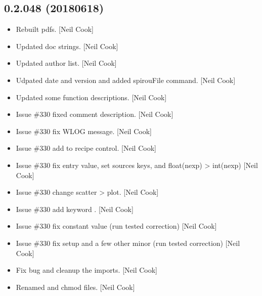 \documentclass[a4paper,10pt,english]{report}
\begin{document}
\subsection{0.2.048 (2018\sphinxhyphen{}06\sphinxhyphen{}18)}
\label{\detokenize{misc/changelog:id436}}\begin{itemize}
\item {} 
Rebuilt pdfs. {[}Neil Cook{]}

\item {} 
Updated doc strings. {[}Neil Cook{]}

\item {} 
Updated author list. {[}Neil Cook{]}

\item {} 
Udpated date and version and added spirouFile command. {[}Neil Cook{]}

\item {} 
Updated some function descriptions. {[}Neil Cook{]}

\item {} 
Issue \#330 \sphinxhyphen{} fixed comment description. {[}Neil Cook{]}

\item {} 
Issue \#330 \sphinxhyphen{} fix WLOG message. {[}Neil Cook{]}

\item {} 
Issue \#330 \sphinxhyphen{} add  to recipe control. {[}Neil Cook{]}

\item {} 
Issue \#330 \sphinxhyphen{} fix entry value, set sources keys, and float(nexp) \textendash{}\textgreater{}
int(nexp) {[}Neil Cook{]}

\item {} 
Issue \#330 \sphinxhyphen{} change scatter \textendash{}\textgreater{} plot. {[}Neil Cook{]}

\item {} 
Issue \#330 \sphinxhyphen{} add keyword . {[}Neil Cook{]}

\item {} 
Issue \#330 \sphinxhyphen{} fix constant value (run tested correction) {[}Neil Cook{]}

\item {} 
Issue \#330 \sphinxhyphen{} fix setup and a few other minor (run tested correction)
{[}Neil Cook{]}

\item {} 
Fix bug and cleanup the imports. {[}Neil Cook{]}

\item {} 
Renamed and chmod files. {[}Neil Cook{]}


\end{itemize}
\end{document}
